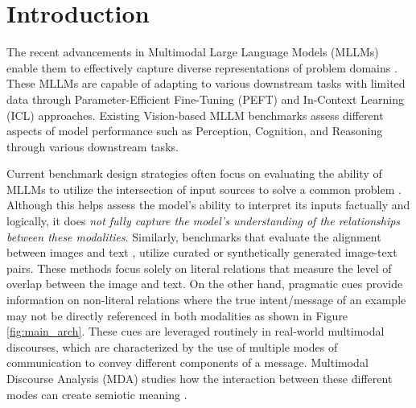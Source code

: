 \section{Introduction}

\begin{figure*}[!ht]
    \centering
    \caption{{\name} presents a combination of literal and pragmatic relations for analyzing the intermodal reasoning capabilities of MLLMs. We evaluate MLLMs on the task of Multimodal Discourse Analysis through the prediction and verification of Coherence Relations across three different discourse domains.}
    \label{fig:main_arch}
\end{figure*}

The recent advancements in Multimodal Large Language Models (MLLMs) enable them to effectively capture diverse representations of problem domains \cite{Alayrac2022-vq, Chen2024-vu, Pichai2024-xj, Liu2024-ay}. These MLLMs are capable of adapting to various downstream tasks with limited data through Parameter-Efficient Fine-Tuning (PEFT) \cite{Hu2021-ft} and In-Context Learning (ICL) \cite{Brown2020-hw} approaches. Existing Vision-based MLLM benchmarks assess different aspects of model performance such as Perception, Cognition, and Reasoning \cite{Li2024-bt} through various downstream tasks. 

Current benchmark design strategies often focus on evaluating the ability of MLLMs to utilize the intersection of input sources to solve a common problem \cite{Kruk2019-ac}. Although this helps assess the model's ability to interpret its inputs factually and logically, it does {\em not fully capture the model's understanding of the relationships between these modalities}. Similarly, benchmarks that evaluate the alignment between images and text \cite{Thrush2022-yf}, utilize curated or synthetically generated image-text pairs. These methods focus solely on literal relations that measure the level of overlap between the image and text. On the other hand, pragmatic cues provide information on non-literal relations where the true intent/message of an example may not be directly referenced in both modalities as shown in Figure \ref{fig:main_arch}. These cues are leveraged routinely in real-world multimodal discourses, which are characterized by the use of multiple modes of communication to convey different components of a message. Multimodal Discourse Analysis (MDA) studies how the interaction between these different modes can create semiotic meaning \cite{Kress2009-iy}.

